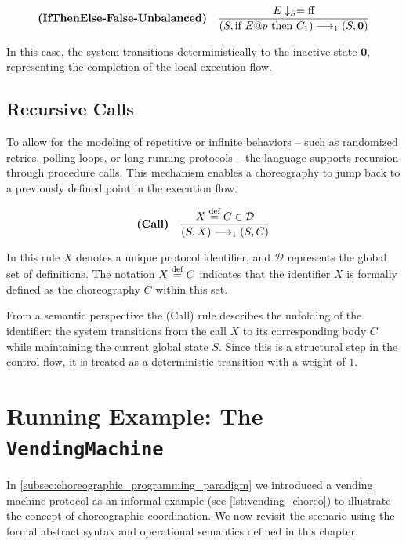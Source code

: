\begin{equation}
	\textbf{(IfThenElse-False-Unbalanced)}~~~
	\frac{E \downarrow_S = \textnormal{ff}}{(S, \textnormal{if } E@p \textnormal{ then } C_1) \longrightarrow_{1} (S, \mathbf{0})}
\end{equation}

In this case, the system transitions deterministically to the inactive state $\textbf{0}$, representing the completion of the local execution flow.

\subsection{Recursive Calls}
\label{paragraph:recursion}
To allow for the modeling of repetitive or infinite behaviors -- such as randomized retries, polling loops, or long-running protocols -- the language supports recursion through procedure calls. This mechanism enables a choreography to jump back to a previously defined point in the execution flow.

\begin{equation}
	\textbf{(Call)}~~~
	\frac{X \stackrel{\textnormal{def}}{=} C \in \mathcal{D}}{(S, X) \longrightarrow_{1} (S, C)}
\end{equation}

In this rule $X$ denotes a unique protocol identifier, and $\mathcal{D}$ represents the global set of definitions. The notation $X \stackrel{\textnormal{def}}{=} C$ indicates that the identifier $X$ is formally defined as the choreography $C$ within this set. 

From a semantic perspective the (Call) rule describes the unfolding of the identifier: the system transitions from the call $X$ to its corresponding body $C$ while maintaining the current global state $S$. Since this is a structural step in the control flow, it is treated as a deterministic transition with a weight of $1$. 


\section{Running Example: The \texttt{VendingMachine}}

In \cref{subsec:choreographic_programming_paradigm} we introduced a vending machine protocol as an informal example (see \cref{lst:vending_choreo}) to illustrate the concept of choreographic coordination. We now revisit the scenario using the formal abstract syntax and operational semantics defined in this chapter. 

